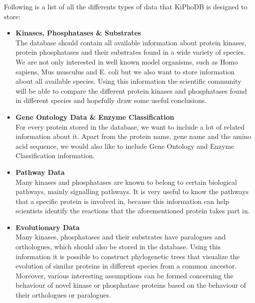 Following is a list of all the differents types of data that KiPhoDB is designed to store:
\begin{itemize}
\item \textbf{Kinases, Phosphatases \& Substrates} \\
The database should contain all available information about protein kinases, protein phosphatases and their substrates found in a wide variety of species.
We are not only interested in well known model organisms, such as Homo sapiens, Mus musculus and E. coli but we also want to store information about
all available species.
Using this information the scientific community will be able to compare the different protein kinases and phosphatases found in different species and
hopefully draw some useful conclusions. 

\item \textbf{Gene Ontology Data \& Enzyme Classification} \\
For every protein stored in the database, we want to include a lot of related information about it.
Apart from the protein name, gene name and the amino acid sequence, we would also like to include Gene Ontology and Enzyme Classification information.

\item \textbf{Pathway Data} \\
Many kinases and phosphatases are known to belong to certain biological pathways, mainly signalling pathways.
It is very useful to know the pathways that a specific protein is involved in, because this information can help scientists identify the reactions that the aforementioned protein takes part in.

\item \textbf{Evolutionary Data} \\
Many kinases, phosphatases and their substrates have paralogues and orthologues, which should also be stored in the database.
Using this information it is possible to construct phylogenetic trees that visualize the evolution of similar proteins in different species from a common ancestor.
Moreover, various interesting assumptions can be formed concerning the behaviour of novel kinase or phosphatase proteins based on the behaviour of their orthologues or paralogues. 
\end{itemize}

